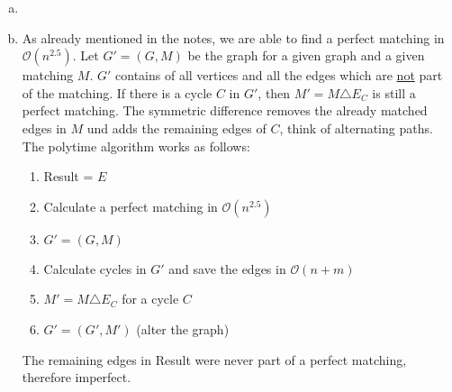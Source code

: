 \documentclass[a4paper,12pt,headsepline]{scrartcl}
\begin{document}
\begin{enumerate}[a)]
	\item
	\item As already mentioned in the notes, we are able to find a perfect matching in $\mathcal{O}(n^{2.5})$. Let $G' = (G,M)$ be the graph for a given graph and a given matching $M$. $G'$ contains of all vertices and all the edges which are \underline{not} part of the matching. If there is a cycle $C$ in $G'$, then $M' = M \triangle E_C$ is still a perfect matching. The symmetric difference removes the already matched edges in $M$ und adds the remaining edges of $C$, think of alternating paths. The polytime algorithm works as follows:
	\begin{enumerate}[1.]
		\item Result = $E$
		\item Calculate a perfect matching in $\mathcal{O}(n^{2.5})$
		\item $G' = (G,M)$
		\item Calculate cycles in $G'$ and save the edges in $\mathcal{O}(n+m)$
		\item $M' = M\triangle E_C$ for a cycle $C$
		\item $G' = (G',M')$ (alter the graph)
	\end{enumerate}
	The remaining edges in Result were never part of a perfect matching, therefore imperfect.
	
\end{enumerate}
\end{document}
